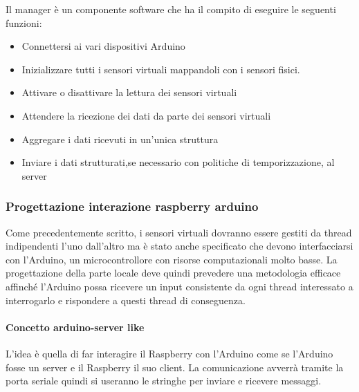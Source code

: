 \documentclass[12pt]{article}
\begin{document}
Il manager è un componente software che ha il compito di eseguire le seguenti funzioni:
\begin{itemize}
\item Connettersi ai vari dispositivi Arduino
\item Inizializzare tutti i sensori virtuali mappandoli con i sensori fisici.
\item Attivare o disattivare la lettura dei sensori virtuali
\item Attendere la ricezione dei dati da parte dei sensori virtuali
\item Aggregare i dati ricevuti in un'unica struttura
\item Inviare i dati strutturati,se necessario con politiche di temporizzazione, al server
\end{itemize}
\subsubsection{Progettazione interazione raspberry arduino}
Come precedentemente scritto, i sensori virtuali dovranno essere gestiti da thread indipendenti l'uno dall'altro ma è stato anche specificato che devono interfacciarsi con l'Arduino, un microcontrollore con risorse computazionali molto basse. La progettazione della parte locale deve quindi prevedere una metodologia efficace affinché l'Arduino possa ricevere un input consistente da ogni thread interessato a interrogarlo e rispondere a questi thread di conseguenza.
\paragraph{Concetto arduino-server like}
L'idea è quella di far interagire il Raspberry con l'Arduino come se l'Arduino fosse un server e il Raspberry il suo client. La comunicazione avverrà tramite la porta seriale quindi si useranno le stringhe per inviare e ricevere messaggi.  
\end{document}
